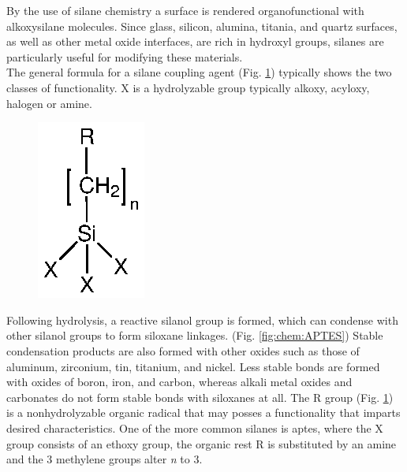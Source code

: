 By the use of silane chemistry a surface is rendered organofunctional with alkoxysilane molecules. Since glass, silicon, alumina, titania, and quartz surfaces, as well as other metal oxide interfaces, are rich in hydroxyl groups, silanes are particularly useful for modifying these materials. \cite{lit:chem:silanizingGlass}\\The general formula for a silane coupling agent (Fig. \ref{fig:chem:trialkoxysilane}) typically shows the two classes of functionality. X is a hydrolyzable group typically alkoxy, acyloxy, halogen or amine.
\\\begin{figure}
	\vspace{-0.7\baselineskip}
	\centering
	\includegraphics{Ressources/Chemistry/Trialkoxysilan}
	\label{fig:chem:trialkoxysilane}
\end{figure} 
Following hydrolysis, a reactive \gls{silanol} group is formed, which can condense with other silanol groups to form \gls{siloxane} linkages. 
(Fig. \ref{fig:chem:APTES}) Stable condensation products are also formed with other oxides such as those of aluminum, zirconium, tin, titanium, and nickel. Less stable bonds are formed with oxides of boron, iron, and carbon, whereas alkali metal oxides and carbonates do not form stable bonds with \glspl{siloxane} at all. The R group (Fig. \ref{fig:chem:trialkoxysilane}) is a nonhydrolyzable organic radical that may posses a functionality that imparts desired characteristics. One of the more common silanes is \gls{aptes}, where the X group consists of an \gls{ethoxy} group, the organic rest R is substituted by an \gls{amine} and the 3 \gls{methylene} groups alter \textit{n} to 3. \cite{lit:chem:GELEST} 
